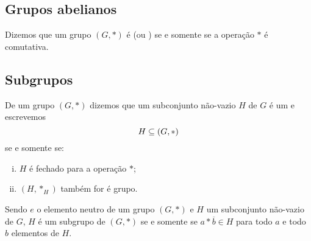 \subsection{Grupos abelianos}

\begin{Def}
  Dizemos que um grupo $(G,\ast )$ é 
  (ou
  ) se e somente se a operação
  $\ast $ é comutativa.
\end{Def}

\subsection{Subgrupos}

\begin{Def}
  De um grupo $(G,\ast )$ dizemos que um subconjunto não-vazio $H$ de $G$ é
  um
   e escrevemos
  \begin{equation*}
    \simb[propriedade de subgrupo de $H$ em relação a
    $(G,\ast)$]{H\subseteq (G,\ast )}
  \end{equation*}
  se e somente se:
  \begin{enumerate}[(i)]
    \item $H$ é fechado para a operação $\ast$;
    \item $(H,\ast_H)$ também for é grupo.
  \end{enumerate}
\end{Def}

\begin{Teo}\label{eqsubgrupo}
  Sendo $e$ o elemento neutro de um grupo $(G,\ast )$ e $H$ um
  subconjunto
  não-vazio de $G$, $H$ é um subgrupo de $(G,\ast )$ se e somente se
  $a\ast \overline{b}\in H$ para todo $a$ e todo $b$ elementos de $H$.
\end{Teo}

